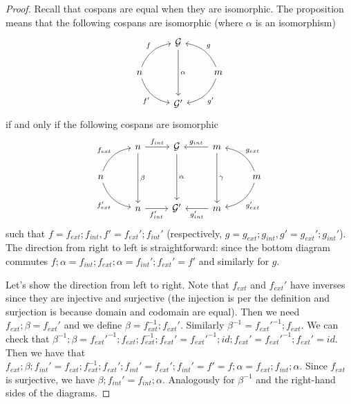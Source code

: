 \begin{proof}
    Recall that cospans are equal when they are isomorphic.
    The proposition means that the following cospans are isomorphic (where $\alpha$ is an isomorphism)
    \[\begin{tikzcd}
            & \mathcal{G} \arrow[dd, "\alpha"] &                                                            \\
    n \arrow[ru, "f", bend left] \arrow[rd, "f'"', bend right] &                                  & m \arrow[lu, "g"', bend right] \arrow[ld, "g'", bend left] \\
            & \mathcal{G}'                     &                                                           
    \end{tikzcd}
    \]
    if and only if the following cospans are isomorphic
    \[
        \begin{tikzcd}
            & n \arrow[r, "f_{int}"] \arrow[dd, "\beta"] & \mathcal{G} \arrow[dd, "\alpha"] & m \arrow[l, "g_{int}"'] \arrow[dd, "\gamma"] &                                                                        \\
n \arrow[ru, "f_{ext}", bend left] \arrow[rd, "f_{ext}'"', bend right] &                                            &                                  &                                              & m \arrow[lu, "g_{ext}"', bend right] \arrow[ld, "g_{ext}'", bend left] \\
            & n \arrow[r, "f_{int}'"']                    & \mathcal{G}'                     & m \arrow[l, "g_{int}'"]                      &                                                                       
\end{tikzcd}    
    \]
    such that $f = f_{ext};f_{int}, f'=f_{ext}';f_{int}'$ (respectively, $g = g_{ext};g_{int}, g' = g_{ext}';g_{int}'$).
    The direction from right to left is straightforward: since the bottom diagram commutes $f;\alpha = f_{int};f_{ext};\alpha = f_{int}';f_{ext}' = f'$ and similarly for $g$.
    
    Let's show the direction from left to right.
    Note that $f_{ext}$ and $f_{ext}'$ have inverses since they are injective and surjective (the injection is per the definition and surjection is because domain and codomain are equal).
    Then we need $f_{ext};\beta = f_{ext}'$ and we define $\beta = f_{ext}^{-1};f_{ext}'$.
    Similarly $\beta^{-1} = f_{ext}'^{-1};f_{ext}$. 
    We can check that $\beta^{-1};\beta = f_{ext}'^{-1};f_{ext};f_{ext}^{-1};f_{ext}' = f_{ext}'^{-1};id;f_{ext}' = f_{ext}'^{-1};f_{ext}' = id$.
    Then we have that $f_{ext};\beta;f_{int}' = f_{ext};f_{ext}^{-1};f_{ext}';f_{int}' = f_{ext}';f_{int}' = f' = f;\alpha = f_{ext};f_{int};\alpha$.
    Since $f_{ext}$ is surjective, we have $\beta;f_{int}' = f_{int};\alpha$.
    Analogously for $\beta^{-1}$ and the right-hand sides of the diagrams.
\end{proof}

